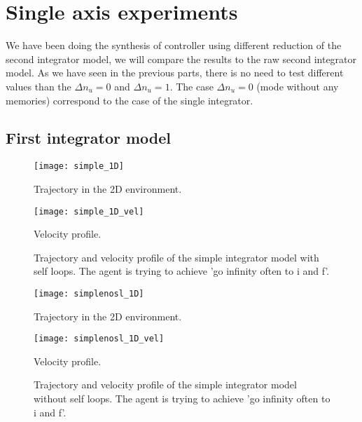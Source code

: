 \section{Single axis experiments}
We have been doing the synthesis of controller using different reduction of the second integrator model, we will compare the results to the raw second integrator model.
As we have seen in the previous parts, there is no need to test different values than the $\Delta n_u = 0$ and $\Delta n_u = 1$.
The case $\Delta n_u = 0$ (mode without any memories) correspond to the case of the single integrator.


\subsection{First integrator model} \label{sec:single_int}
\begin{figure}[!ht]
	\begin{minipage}[b]{0.5\textwidth}
  		\centering
  		\texttt{[image: simple\_1D]}
	  	\caption{Trajectory in the 2D environment.}
	  	\label{simple_1D}
  \end{minipage}
	\begin{minipage}[b]{0.5\textwidth}
  		\centering
  		\texttt{[image: simple\_1D\_vel]}
	  	\caption{Velocity profile.}
	  	\label{simple_1D_vel}
  \end{minipage}
  \caption{Trajectory and velocity profile of the simple integrator model with self loops. The agent is trying to achieve 'go infinity often to i and f'.}
\end{figure}

\begin{figure}[!ht]
	\begin{minipage}[b]{0.5\textwidth}
  		\centering
  		\texttt{[image: simplenosl\_1D]}
	  	\caption{Trajectory in the 2D environment.}
	  	\label{simplenosl_1D}
  \end{minipage}
	\begin{minipage}[b]{0.5\textwidth}
  		\centering
  		\texttt{[image: simplenosl\_1D\_vel]}
	  	\caption{Velocity profile.}
	  	\label{simplenosl_1D_vel}
  \end{minipage}
  \caption{Trajectory and velocity profile of the simple integrator model without self loops. The agent is trying to achieve 'go infinity often to i and f'.}
\end{figure}

